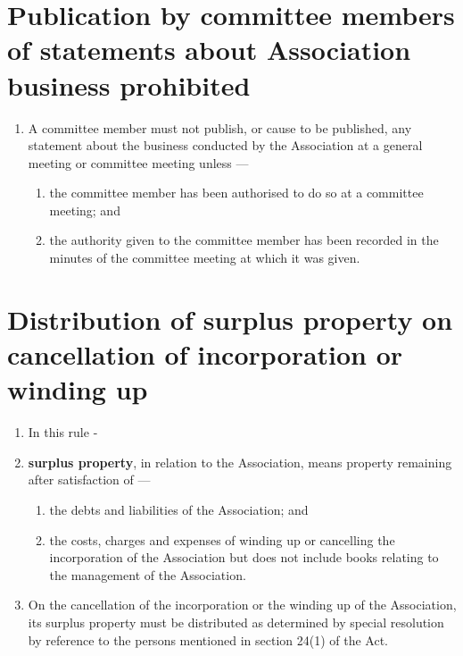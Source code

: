 \hypertarget{publication-by-committee-members-of-statements-about-association-business-prohibited}{%
\section{Publication by committee members of statements about Association business prohibited}\label{publication-by-committee-members-of-statements-about-association-business-prohibited}}

\begin{enumerate}

\item A committee member must not publish, or cause to be published, any statement about the business conducted by the Association at a general meeting or committee meeting unless ---

  \begin{enumerate}
  
  \item the committee member has been authorised to do so at a committee meeting; and
  \item the authority given to the committee member has been recorded in the minutes of the committee meeting at which it was given.
  \end{enumerate}
\end{enumerate}

\hypertarget{distribution-of-surplus-property-on-cancellation-of-incorporation-or-winding-up}{%
\section{Distribution of surplus property on cancellation of incorporation or winding up}\label{distribution-of-surplus-property-on-cancellation-of-incorporation-or-winding-up}}

\begin{enumerate}

\item In this rule -
\item \textbf{surplus property}, in relation to the Association, means property remaining after satisfaction of ---

  \begin{enumerate}
  
  \item the debts and liabilities of the Association; and
  \item the costs, charges and expenses of winding up or cancelling the incorporation of the Association but does not include books relating to the management of the Association.
  \end{enumerate}
\item On the cancellation of the incorporation or the winding up of the Association, its surplus property must be distributed as determined by special resolution by reference to the persons mentioned in section 24(1) of the Act.
\end{enumerate}

